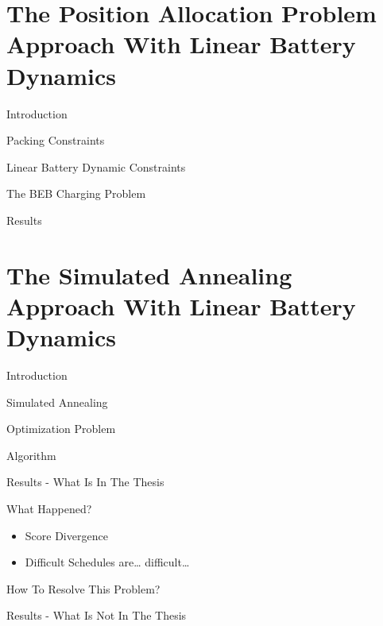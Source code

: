 \documentclass[bigger]{beamer}
\begin{document}
\section{The Position Allocation Problem Approach With Linear Battery Dynamics}
\label{sec:org21e723b}
\begin{frame}[label={sec:org7c57304}]{Introduction}
\end{frame}
\begin{frame}[label={sec:org18c1518}]{Packing Constraints}
\end{frame}
\begin{frame}[label={sec:org7e672a1}]{Linear Battery Dynamic Constraints}
\end{frame}
\begin{frame}[label={sec:orge549c74}]{The BEB Charging Problem}
\end{frame}
\begin{frame}[label={sec:orgc86aa21}]{Results}
\end{frame}
\section{The Simulated Annealing Approach With Linear Battery Dynamics}
\label{sec:org2b4e136}
\begin{frame}[label={sec:org7cd79e2}]{Introduction}
\end{frame}
\begin{frame}[label={sec:org6f8391b}]{Simulated Annealing}
\end{frame}
\begin{frame}[label={sec:orge2b13c2}]{Optimization Problem}
\end{frame}
\begin{frame}[label={sec:org8a6db78}]{Algorithm}
\end{frame}
\begin{frame}[label={sec:org2a0786a}]{Results - What Is In The Thesis}
\end{frame}
\begin{frame}[label={sec:org2002e98}]{What Happened?}
\begin{itemize}
\item Score Divergence
\item Difficult Schedules are\ldots{} difficult\ldots{}
\end{itemize}
\end{frame}
\begin{frame}[label={sec:org5841e7a}]{How To Resolve This Problem?}
\end{frame}
\begin{frame}[label={sec:orgfd80d86}]{Results - What Is Not In The Thesis}
\end{frame}
\end{document}
